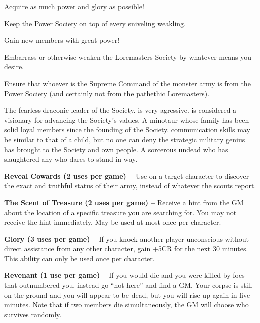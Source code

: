 \documentclass[blue]{guildcamp2}
\begin{document}
\begin{itemz}[Goals]
  \item Acquire as much power and glory as possible!
  \item Keep the Power Society on top of every sniveling weakling.
  \item Gain new members with great power!
  \item Embarrass or otherwise weaken the Loremasters Society by whatever means you desire.
    \item Ensure that whoever is the Supreme Command of the monster army is from the Power Society (and certainly not from the pathethic Loremasters).
\end{itemz}


\begin{members} 
  \member{\cRed{}} The fearless draconic leader of the Society. \cRed{\They} is very agressive. \cRed{\They} is considered a visionary for advancing the Society's values.
	\member{\cMinotaur{}} A minotaur whose family has been solid loyal members since the founding of the Society. \cMinotaur{\Their} communication skills may be similar to that of a child, but no one can deny the strategic military genius \cMinotaur{\they} has brought to the Society and \cMinotaur{\their} own people.
	\member{\cLich{}} A sorcerous undead who has slaughtered any who dares to stand in \cLich{\their} way.
\end{members}

\begin{itemz}
	\item \textbf{Reveal Cowards (2 uses per game) --} Use on a target character to discover the exact and truthful status of their army, instead of whatever the scouts report.
	\item \textbf{The Scent of Treasure (2 uses per game) --} Receive a hint from the GM about the location of a specific treasure you are searching for. You may not receive the hint immediately. May be used at most once per character.
\item \textbf{Glory (3 uses per game) --} If you knock another player unconscious without direct assistance from any other character, gain +5CR for the next 30 minutes. This ability can only be used once per character.
	\item \textbf{Revenant (1 use per game) --} If you would die and you were killed by foes that outnumbered you, instead go ``not here'' and find a GM.  Your corpse is still on the ground and you will appear to be dead, but you will rise up again in five minutes. Note that if two members die simultaneously, the GM will choose who survives randomly.
\end{itemz}
\end{document}
